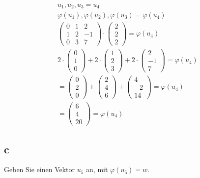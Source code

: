 \begin{align*}
    u_1, u_2, u_3 = u_4 \\
    \varphi(u_1), \varphi(u_2), \varphi(u_3) = \varphi(u_4) \\
    \begin{pmatrix}
        0 & 1 & 2 \\ 1 & 2 & -1 \\ 0 & 3 & 7
    \end{pmatrix} \cdot \begin{pmatrix}
        2 \\ 2 \\ 2
    \end{pmatrix} = \varphi(u_4) \\
    2 \cdot \begin{pmatrix}
        0 \\ 1 \\ 0
    \end{pmatrix} + 2 \cdot \begin{pmatrix}
        1 \\ 2 \\ 3
    \end{pmatrix} + 2 \cdot \begin{pmatrix}
        2 \\ -1 \\ 7
    \end{pmatrix} = \varphi(u_4) \\
    = \begin{pmatrix}
        0 \\ 2 \\ 0
    \end{pmatrix} + \begin{pmatrix}
        2 \\ 4 \\ 6
    \end{pmatrix} + \begin{pmatrix}
        4 \\ -2 \\ 14
    \end{pmatrix} = \varphi(u_4) \\
    = \begin{pmatrix}
        6 \\ 4 \\ 20
    \end{pmatrix} = \varphi(u_4)
\end{align*}

\subsection{c}
Geben Sie einen Vektor $u_5$ an, mit $\varphi(u_5) = w$.

